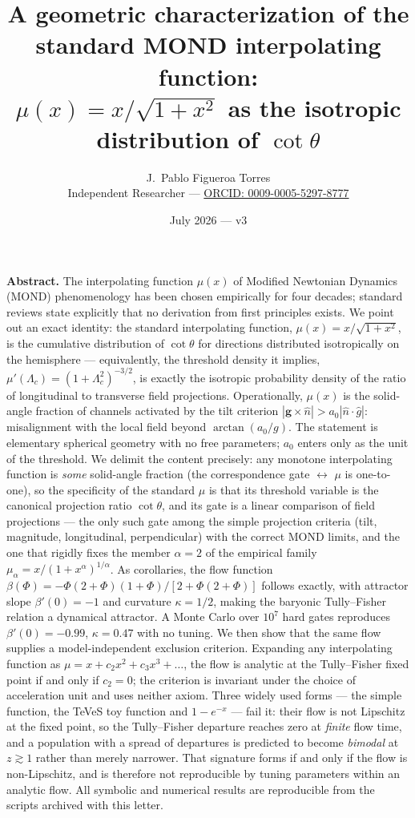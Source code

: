 \documentclass[11pt]{article}
\title{\vspace{-2em}A geometric characterization of the standard MOND interpolating function:\\[2pt]
$\mu(x) = x/\sqrt{1+x^2}$ as the isotropic distribution of $\cot\theta$}
\author{J.\ Pablo Figueroa Torres\\[2pt]
\normalsize Independent Researcher --- \href{https://orcid.org/0009-0005-5297-8777}{ORCID: 0009-0005-5297-8777}}
\date{July 2026 --- v3}
\theoremstyle{plain}
\begin{document}
\maketitle
\vspace{-1.5em}

\noindent\textbf{Abstract.} The interpolating function $\mu(x)$ of Modified Newtonian Dynamics (MOND) phenomenology has been chosen empirically for four decades; standard reviews state explicitly that no derivation from first principles exists. We point out an exact identity: the standard interpolating function, $\mu(x) = x/\sqrt{1+x^2}$, is the cumulative distribution of $\cot\theta$ for directions distributed isotropically on the hemisphere --- equivalently, the threshold density it implies, $\mu'(\Lambda_c) = (1+\Lambda_c^2)^{-3/2}$, is exactly the isotropic probability density of the ratio of longitudinal to transverse field projections. Operationally, $\mu(x)$ is the solid-angle fraction of channels activated by the tilt criterion $|\mathbf{g}\times\hat n| > a_0|\hat n\cdot\hat g|$: misalignment with the local field beyond $\arctan(a_0/g)$. The statement is elementary spherical geometry with no free parameters; $a_0$ enters only as the unit of the threshold. We delimit the content precisely: any monotone interpolating function is \emph{some} solid-angle fraction (the correspondence gate $\leftrightarrow$ $\mu$ is one-to-one), so the specificity of the standard $\mu$ is that its threshold variable is the canonical projection ratio $\cot\theta$, and its gate is a linear comparison of field projections --- the only such gate among the simple projection criteria (tilt, magnitude, longitudinal, perpendicular) with the correct MOND limits, and the one that rigidly fixes the member $\alpha=2$ of the empirical family $\mu_\alpha = x/(1+x^\alpha)^{1/\alpha}$. As corollaries, the flow function $\beta(\Phi) = -\Phi(2+\Phi)(1+\Phi)/[2+\Phi(2+\Phi)]$ follows exactly, with attractor slope $\beta'(0)=-1$ and curvature $\kappa=1/2$, making the baryonic Tully--Fisher relation a dynamical attractor. A Monte Carlo over $10^7$ hard gates reproduces $\beta'(0)=-0.99$, $\kappa=0.47$ with no tuning. We then show that the same flow supplies a model-independent exclusion criterion. Expanding any interpolating function as $\mu = x + c_2x^2 + c_3x^3 + \dots$, the flow is analytic at the Tully--Fisher fixed point if and only if $c_2=0$; the criterion is invariant under the choice of acceleration unit and uses neither axiom. Three widely used forms --- the simple function, the TeVeS toy function and $1-e^{-x}$ --- fail it: their flow is not Lipschitz at the fixed point, so the Tully--Fisher departure reaches zero at \emph{finite} flow time, and a population with a spread of departures is predicted to become \emph{bimodal} at $z\gtrsim1$ rather than merely narrower. That signature forms if and only if the flow is non-Lipschitz, and is therefore not reproducible by tuning parameters within an analytic flow. All symbolic and numerical results are reproducible from the scripts archived with this letter.
\end{document}
